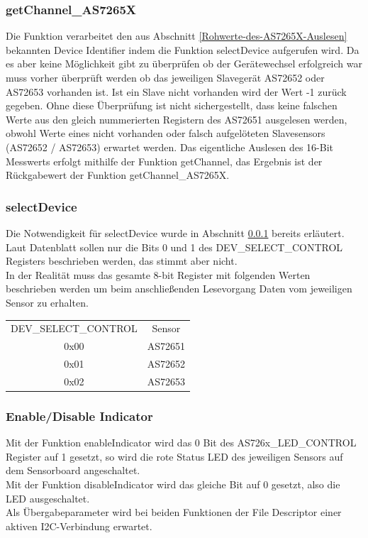 \subsubsection{getChannel\_AS7265X}\label{getChannel_AS7265X}
Die Funktion verarbeitet den aus Abschnitt \ref{Rohwerte-des-AS7265X-Auslesen} bekannten Device Identifier indem die Funktion selectDevice aufgerufen wird.
	Da es aber keine Möglichkeit gibt zu überprüfen ob der Gerätewechsel erfolgreich war muss vorher überprüft werden ob das jeweiligen Slavegerät AS72652 oder AS72653 vorhanden ist.
	Ist ein Slave nicht vorhanden wird der Wert -1 zurück gegeben.
	Ohne diese Überprüfung ist nicht sichergestellt, dass keine falschen Werte aus den gleich nummerierten Registern des AS72651 ausgelesen werden, obwohl Werte eines nicht vorhanden oder falsch aufgelöteten Slavesensors (AS72652 / AS72653) erwartet werden.
	Das eigentliche Auslesen des 16-Bit Messwerts erfolgt mithilfe der Funktion getChannel, das Ergebnis ist der Rückgabewert der Funktion getChannel\_AS7265X.\\



\subsubsection{selectDevice}
Die Notwendigkeit für selectDevice wurde in Abschnitt \ref{getChannel_AS7265X} bereits erläutert.
Laut Datenblatt sollen nur die Bits 0 und 1 des DEV\_SELECT\_CONTROL Registers beschrieben werden, das stimmt aber nicht.\\
In der Realität muss das gesamte 8-bit Register mit folgenden Werten beschrieben werden um beim anschließenden Lesevorgang Daten vom jeweiligen Sensor zu erhalten.
\begin{center}
\begin{tabular}{ c c }
 	DEV\_SELECT\_CONTROL & Sensor \\ 
 	0x00 & AS72651 \\  
 	0x01 & AS72652 \\
 	0x02 & AS72653 \\  
\end{tabular}
\end{center}



\subsubsection{Enable/Disable Indicator}
Mit der Funktion enableIndicator wird das 0 Bit des AS726x\_LED\_CONTROL Register auf 1 gesetzt, so wird die rote Status LED des jeweiligen Sensors auf dem Sensorboard angeschaltet.\\
Mit der Funktion disableIndicator wird das gleiche Bit auf 0 gesetzt, also die LED ausgeschaltet.\\
Als Übergabeparameter wird bei beiden Funktionen der File Descriptor einer aktiven I2C-Verbindung erwartet.\\

